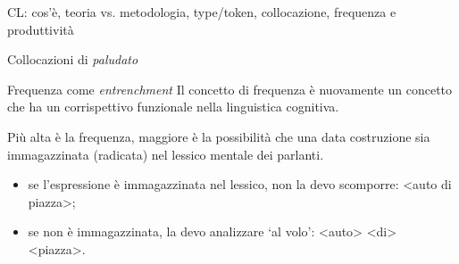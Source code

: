 \documentclass[pdf]{prosper}
\begin{document}
\begin{tsectionandpart}{CL: cos'è, teoria vs. metodologia, type/token, collocazione, frequenza e produttività}
{\begin{slide}{Collocazioni di {\it paludato}}
\end{slide}
}


\begin{slide}{Frequenza come {\it entrenchment}}
	Il concetto di frequenza è nuovamente un concetto che ha un corrispettivo funzionale nella linguistica cognitiva.
	
	Più alta è la frequenza, maggiore è la possibilità che una data costruzione sia immagazzinata (radicata) nel lessico mentale dei parlanti.

	\begin{itemize}
		\item se l'espressione è immagazzinata nel lessico, non la devo scomporre: <auto di piazza>;
		\item se non è immagazzinata, la devo analizzare `al volo': <auto> <di> <piazza>.

	\end{itemize}
\end{slide}

\end{tsectionandpart}
\end{document}
